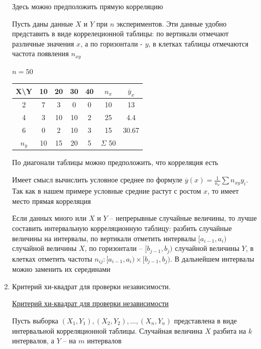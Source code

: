 \documentclass[12pt]{article}
\begin{document}
\begin{enumerate}
\begin{multicols}{2}
\begin{center}
            Здесь можно предположить прямую корреляцию
        \end{center}
    \end{multicols}

    Пусть даны данные $X$ и $Y$ при $n$ экспериментов. Эти данные удобно представить в виде коррелеционной таблицы:
    по вертикали отмечают различные значения $x$, а по горизонтали - $y$, в клетках таблицы отмечаются частота появления $n_{xy}$

    \Ex $n = 50$

    \smallvspace

    \begin{tabular}{c|c|c|c|c|c|c}
        X\backslash Y & 10 & 20 & 30 & 40 & $n_x$ & $\overline y_x$ \\
        \hline
        2 & 7 & 3 & 0 & 0 & 10 & 13 \\
        \hline
        4 & 3 & 10 & 10 & 2 & 25 & 4.4 \\
        \hline
        6 & 0 & 2 & 10 & 3 & 15 & 30.67 \\
        \hline
        $n_y$ & 10 & 15 & 20 & 5 & $\Sigma$ 50 & \\
    \end{tabular}

    \smallvspace

    По диагонали таблицы можно предположить, что корреляция есть

    Имеет смысл вычислить условное среднее по формуле $\overline y (x) = \frac{1}{n_x} \sum n_{xy} y_i$. Так как в нашем примере
    условные средние растут с ростом $x$, то имеет место прямая корреляция

    \Notas Если данных много или $X$ и $Y$ -- непрерывные случайные величины, то лучше составить интервальную корреляционную таблицу:
    разбить случайные величины на интервалы, по вертикали отметить интервалы $[a_{i - 1}, a_i)$ случайной величины $X$, 
    по горизонтали -- $[b_{j - 1}, b_j)$ случайной величины $Y$, в клетках 
    отметить частоты $n_{ij} : [a_{i - 1}, a_i) \times [b_{j - 1}, b_j)$. В дальнейшем интервалы можно заменить их серединами

    \item Критерий хи-квадрат для проверки независимости.

    \hyperlink{chi_square_independence_criterion}{Критерий хи-квадрат для проверки независимости}
    
    Пусть выборка $(X_1, Y_1), (X_2, Y_2), \dots, (X_n, Y_n)$ представлена в виде интервальной корреляционной таблицы. Случайная величина $X$ 
    разбита на $k$ интервалов, а $Y$ -- на $m$ интервалов


\end{enumerate}
\end{document}
